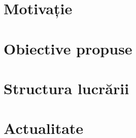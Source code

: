 \section{Motivație}

\section{Obiective propuse}

\section{Structura lucrării}

\section{Actualitate}
